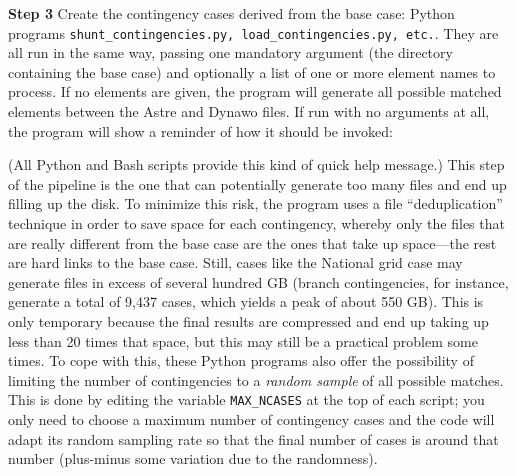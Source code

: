 \documentclass[11pt, a4paper, twoside, titlepage]{article}
\newcommand{\code}[1]{\texttt{#1}}
\begin{document}
\noindent\textbf{Step 3} Create the contingency cases derived from the
base case: Python programs \code{shunt\_contingencies.py,
  load\_contingencies.py, etc.}. They are all run in the same way,
passing one mandatory argument (the directory containing the base
case) and optionally a list of one or more element names to
process. If no elements are given, the program will generate all
possible matched elements between the Astre and Dynawo files.  If run
with no arguments at all, the program will show a reminder of how it
should be invoked:
(All Python and Bash scripts provide this kind of quick help message.)
This step of the pipeline is the one that can potentially generate too
many files and end up filling up the disk. To minimize this risk, the
program uses a file ``deduplication'' technique in order to save space
for each contingency, whereby only the files that are really different
from the base case are the ones that take up space---the rest are hard
links to the base case. Still, cases like the National grid case may
generate files in excess of several hundred GB (branch contingencies,
for instance, generate a total of 9,437 cases, which yields a peak of
about 550 GB). This is only temporary because the final results are
compressed and end up taking up less than 20 times that space, but
this may still be a practical problem some times. To cope with this,
these Python programs also offer the possibility of limiting the
number of contingencies to a \emph{random sample} of all possible
matches. This is done by editing the variable \code{MAX\_NCASES} at
the top of each script; you only need to choose a maximum number of
contingency cases and the code will adapt its random sampling rate so
that the final number of cases is around that number (plus-minus some
variation due to the randomness).
\end{document}
